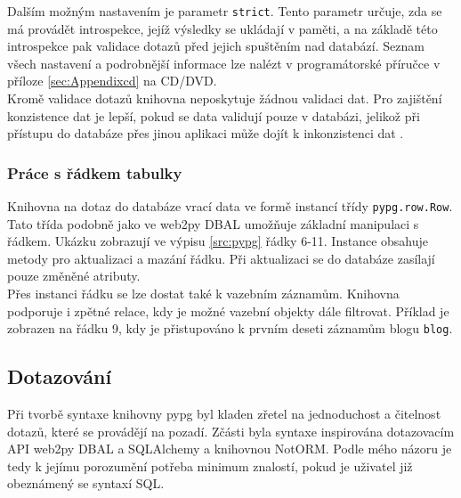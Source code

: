 \documentclass[ing,male,java,dept456]{diploma}						%
\begin{document}
Dalším možným nastavením je parametr \lstinline[style=inlinepython]|strict|. Tento parametr určuje, zda se má provádět introspekce, jejíž výsledky se ukládají v paměti, a na základě této introspekce pak validace dotazů před jejich spuštěním nad databází. Seznam všech nastavení a podrobnější informace lze nalézt v programátorské příručce v příloze \ref{sec:Appendixcd} na CD/DVD. \\
Kromě validace dotazů knihovna neposkytuje žádnou validaci dat. Pro zajištění konzistence dat je lepší, pokud se data validují pouze v databázi, jelikož při přístupu do databáze přes jinou aplikaci může dojít k inkonzistenci dat \cite{notorm-why}. \\

\subsubsection{Práce s řádkem tabulky}

Knihovna na dotaz do databáze vrací data ve formě instancí třídy \lstinline[style=inlinepython]|pypg.row.Row|. Tato třída podobně jako ve web2py DBAL umožňuje základní manipulaci s řádkem. Ukázku zobrazují ve výpisu \ref{src:pypg} řádky 6-11. Instance obsahuje metody pro aktualizaci a mazání řádku. Při aktualizaci se do databáze zasílají pouze změněné atributy. \\
Přes instanci řádku se lze dostat také k vazebním záznamům. Knihovna podporuje i zpětné relace, kdy je možné vazební objekty dále filtrovat. Příklad je zobrazen na řádku 9, kdy je přistupováno k prvním deseti záznamům blogu \lstinline[style=inlinepython]|blog|.

\subsection{Dotazování}

Při tvorbě syntaxe knihovny pypg byl kladen zřetel na jednoduchost a čitelnost dotazů, které se provádějí na pozadí. Zčásti byla syntaxe inspirována dotazovacím API web2py DBAL a SQLAlchemy a knihovnou NotORM. Podle mého názoru je tedy k jejímu porozumění potřeba minimum znalostí, pokud je uživatel již obeznámený se syntaxí SQL. \\
\end{document}
